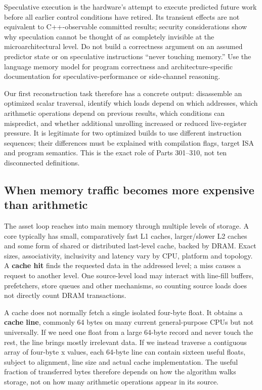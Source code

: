 Speculative execution is the hardware's attempt to execute predicted future work before all earlier control conditions have retired. Its transient effects are not equivalent to C++-observable committed results; security considerations show why speculation cannot be thought of as completely invisible at the microarchitectural level. Do not build a correctness argument on an assumed predictor state or on speculative instructions ``never touching memory.'' Use the language memory model for program correctness and architecture-specific documentation for speculative-performance or side-channel reasoning.

Our first reconstruction task therefore has a concrete output: disassemble an optimized scalar traversal, identify which loads depend on which addresses, which arithmetic operations depend on previous results, which conditions can mispredict, and whether additional unrolling increased or reduced live-register pressure. It is legitimate for two optimized builds to use different instruction sequences; their differences must be explained with compilation flags, target ISA and program semantics. This is the exact role of Parts 301--310, not ten disconnected definitions.

\subsection{When memory traffic becomes more expensive than arithmetic}\label{01-foundations-i-ch007-when-memory-traffic-becomes-more-expensive-than-arithmetic}

The asset loop reaches into main memory through multiple levels of storage. A core typically has small, comparatively fast L1 caches, larger/slower L2 caches and some form of shared or distributed last-level cache, backed by DRAM. Exact sizes, associativity, inclusivity and latency vary by CPU, platform and topology. A \textbf{cache hit} finds the requested data in the addressed level; a miss causes a request to another level. One source-level load may interact with line-fill buffers, prefetchers, store queues and other mechanisms, so counting source loads does not directly count DRAM transactions.

A cache does not normally fetch a single isolated four-byte float. It obtains a \textbf{cache line}, commonly 64 bytes on many current general-purpose CPUs but not universally. If we need one float from a large 64-byte record and never touch the rest, the line brings mostly irrelevant data. If we instead traverse a contiguous array of four-byte x values, each 64-byte line can contain sixteen useful floats, subject to alignment, line size and actual cache implementation. The useful fraction of transferred bytes therefore depends on how the algorithm walks storage, not on how many arithmetic operations appear in its source.

